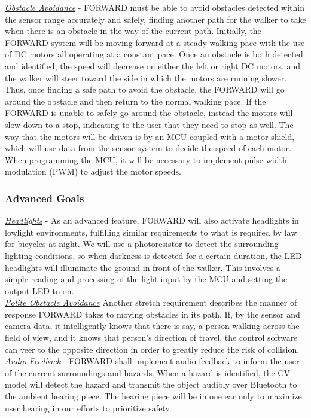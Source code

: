 \noindent \underline{\textit{Obstacle Avoidance}} - FORWARD must be able to avoid obstacles detected within the sensor range accurately and safely, finding another path for the walker to take when there is an obstacle in the way of the current path. Initially, the FORWARD system will be moving forward at a steady walking pace with the use of DC motors all operating at a constant pace. Once an obstacle is both detected and identified, the speed will decrease on either the left or right DC motors, and the walker will steer toward the side in which the motors are running slower. Thus, once finding a safe path to avoid the obstacle, the FORWARD will go around the obstacle and then return to the normal walking pace. If the FORWARD is unable to safely go around the obstacle, instead the motors will slow down to a stop, indicating to the user that they need to stop as well. The way that the motors will be driven is by an MCU coupled with a motor shield, which will use data from the sensor system to decide the speed of each motor. When programming the MCU, it will be necessary to implement pulse width modulation (PWM) to adjust the motor speeds.\\

\subsubsection{Advanced Goals}
\noindent \underline{\textit{Headlights}} - As an advanced feature, FORWARD will also activate headlights in lowlight environments, fulfilling similar requirements to what is required by law for bicycles at night. We will use a photoresistor to detect the surrounding lighting conditions, so when darkness is detected for a certain duration, the LED headlights will illuminate the ground in front of the walker. This involves a simple reading and processing of the light input by the MCU and setting the output LED to on. \\

\noindent \underline{\textit{Polite Obstacle Avoidance}}
Another stretch requirement describes the manner of response FORWARD takes to moving obstacles in its path. If, by the sensor and camera data, it intelligently knows that there is say, a person walking across the field of view, and it knows that person's direction of travel, the control software can veer to the opposite direction in order to greatly reduce the risk of collision.\\

\noindent \underline{\textit{Audio Feedback}} - FORWARD shall implement audio feedback to inform the user of the current surroundings and hazards. When a hazard is identified, the CV model will detect the hazard and transmit the object audibly over Bluetooth to the ambient hearing piece. The hearing piece will be in one ear only to maximize user hearing in our efforts to prioritize safety. \\

